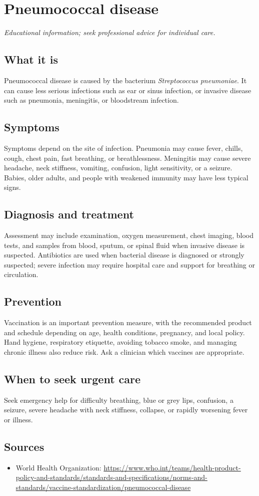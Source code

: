 \chapter{Pneumococcal disease}

\medskip
\noindent\textit{Educational information; seek professional advice for individual care.}

\section*{What it is}
Pneumococcal disease is caused by the bacterium \textit{Streptococcus pneumoniae}. It can cause less serious infections such as ear or sinus infection, or invasive disease such as pneumonia, meningitis, or bloodstream infection.

\section*{Symptoms}
Symptoms depend on the site of infection. Pneumonia may cause fever, chills, cough, chest pain, fast breathing, or breathlessness. Meningitis may cause severe headache, neck stiffness, vomiting, confusion, light sensitivity, or a seizure. Babies, older adults, and people with weakened immunity may have less typical signs.

\section*{Diagnosis and treatment}
Assessment may include examination, oxygen measurement, chest imaging, blood tests, and samples from blood, sputum, or spinal fluid when invasive disease is suspected. Antibiotics are used when bacterial disease is diagnosed or strongly suspected; severe infection may require hospital care and support for breathing or circulation.

\section*{Prevention}
Vaccination is an important prevention measure, with the recommended product and schedule depending on age, health conditions, pregnancy, and local policy. Hand hygiene, respiratory etiquette, avoiding tobacco smoke, and managing chronic illness also reduce risk. Ask a clinician which vaccines are appropriate.

\section*{When to seek urgent care}
Seek emergency help for difficulty breathing, blue or grey lips, confusion, a seizure, severe headache with neck stiffness, collapse, or rapidly worsening fever or illness.

\section*{Sources}
\begin{itemize}
\item World Health Organization: \url{https://www.who.int/teams/health-product-policy-and-standards/standards-and-specifications/norms-and-standards/vaccine-standardization/pneumococcal-disease}
\end{itemize}
